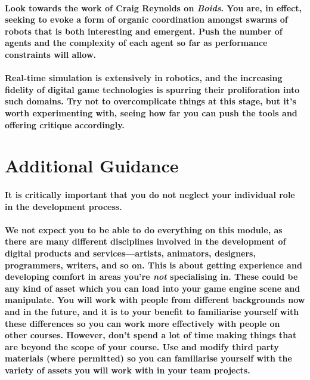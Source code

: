 \documentclass{../../fal_assignment}
\begin{document}
\paragraph{Look towards the work of Craig Reynolds on \textit{Boids}. You are, in effect, seeking to evoke a form of organic coordination amongst swarms of robots that is both interesting and emergent. Push the number of agents and the complexity of each agent so far as performance constraints will allow.}

\paragraph{Real-time simulation is extensively in robotics, and the increasing fidelity of digital game technologies is spurring their proliforation into such domains. Try not to overcomplicate things at this stage, but it's worth experimenting with, seeing how far you can push the tools and offering critique accordingly.}

\newpage
\section*{Additional Guidance}

\paragraph{It is critically important that you do not neglect your individual role in the development process.}

\paragraph{We not expect you to be able to do everything on this module, as there are many different disciplines involved in the development of digital products and services---artists, animators, designers, programmers, writers, and so on. This is about getting experience and developing comfort in areas you're \textit{not} specialising in. These could be any kind of asset which you can load into your game engine scene and manipulate. You will work with people from different backgrounds now and in the future, and it is to your benefit to familiarise yourself with these differences so you can work more effectively with people on other courses. However, don't spend a lot of time making things that are beyond the scope of your course. Use and modify third party materials (where permitted) so you can familiarise yourself with the variety of assets you will work with in your team projects.}
\end{document}
